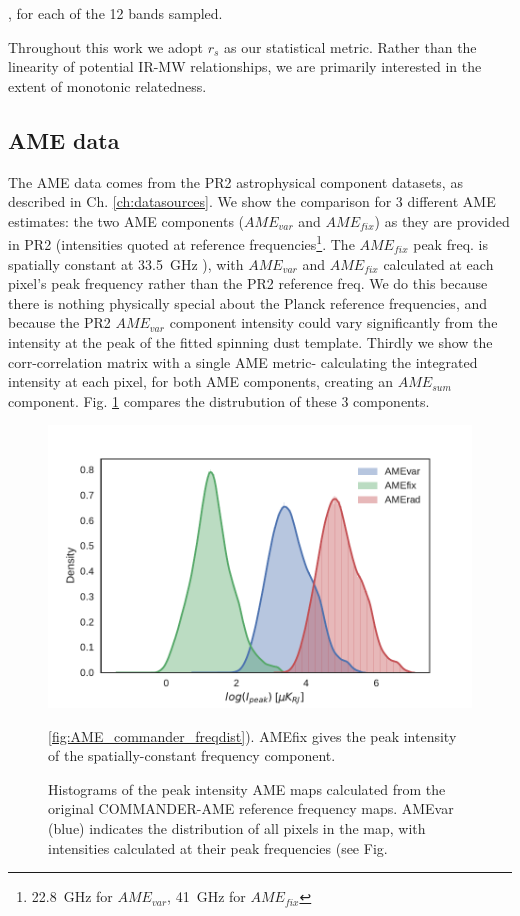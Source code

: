     , for each of the 12 bands sampled.{Throughout this work we adopt $r_{s}$ as our statistical metric. Rather than the linearity of potential IR-MW relationships, we are primarily interested in the extent of monotonic relatedness.


    \subsection{AME data}
       The AME data comes from the PR2 astrophysical component datasets, as described in Ch. \ref{ch:datasources}. We show the comparison for 3 different AME estimates: the two AME components ($AME_{var}$ and $AME_{fix}$) as they are provided in PR2 (intensities quoted at reference frequencies\footnote{22.8~GHz for $AME_{var}$, 41~GHz for $AME_{fix}$}. The  $AME_{fix}$ peak freq. is spatially constant at 33.5~GHz ), with $AME_{var}$ and $AME_{fix}$ calculated at each pixel's peak frequency rather than the PR2 reference freq. We do this because there is nothing physically special about the Planck reference frequencies, and because the PR2 $AME_{var}$ component intensity could vary significantly from the intensity at the peak of the fitted spinning dust template. Thirdly we show the corr-correlation matrix with a single AME metric- calculating the integrated intensity at each pixel, for both AME components, creating an $AME_{sum}$ component. Fig. \ref{fig:AME_comps_distplot} compares the distrubution of these 3 components.

       \begin{figure}
         \includegraphics[width=\textwidth]{../Plots/ch_allsky/AME_comps_distplot.pdf}
         \centering
         \caption{Histograms of the peak intensity AME maps calculated from the original COMMANDER-AME reference frequency maps. AMEvar (blue) indicates the distribution of all pixels in the map, with intensities calculated at their peak frequencies (see Fig.} \ref{fig:AME_commander_freqdist}). AMEfix gives the peak intensity of the spatially-constant frequency component.
         \label{fig:AME_comps_distplot}
       \end{figure}

}
